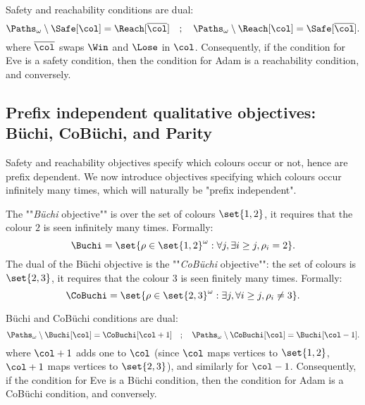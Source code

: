Safety and reachability conditions are dual:
\[
\Paths_\omega \setminus \Safe[\col] = \Reach[\overline{\col}] \quad ; \quad
\Paths_\omega \setminus \Reach[\col] = \Safe[\overline{\col}].
\]
where $\overline{\col}$ swaps $\Win$ and $\Lose$ in $\col$.
Consequently, if the condition for Eve is a safety condition, then the condition for Adam is a reachability condition, and conversely.

\subsection*{Prefix independent qualitative objectives: B{\"u}chi, CoB{\"u}chi, and Parity}
Safety and reachability objectives specify which colours occur or not, hence are prefix dependent.
We now introduce objectives specifying which colours occur infinitely many times, which will naturally be "prefix independent".

The ""\textit{B{\"u}chi} objective"" is over the set of colours $\set{1,2}$,
it requires that the colour $2$ is seen infinitely many times.
Formally:
\[
\Buchi = \set{\rho \in \set{1,2}^\omega : \forall j, \exists i \ge j, \rho_i = 2}.
\]
The dual of the B{\"u}chi objective is the ""\textit{CoB{\"uchi}} objective"": 
the set of colours is $\set{2,3}$, it requires that the colour $3$ is seen finitely many times.
Formally:
\[
\CoBuchi = \set{\rho \in \set{2,3}^\omega : \exists j, \forall i \ge j, \rho_i \neq 3}.
\]

B{\"u}chi and CoB{\"u}chi conditions are dual:
\[
\Paths_\omega \setminus \Buchi[\col] = \CoBuchi[\col + 1] \quad ; \quad
\Paths_\omega \setminus \CoBuchi[\col] = \Buchi[\col - 1].
\]
where $\col + 1$ adds one to $\col$ (since $\col$ maps vertices to $\set{1,2}$, $\col + 1$ maps vertices to $\set{2,3}$),
and similarly for $\col - 1$.
Consequently, if the condition for Eve is a B{\"u}chi condition, then the condition for Adam is a CoB{\"u}chi condition, and conversely.

